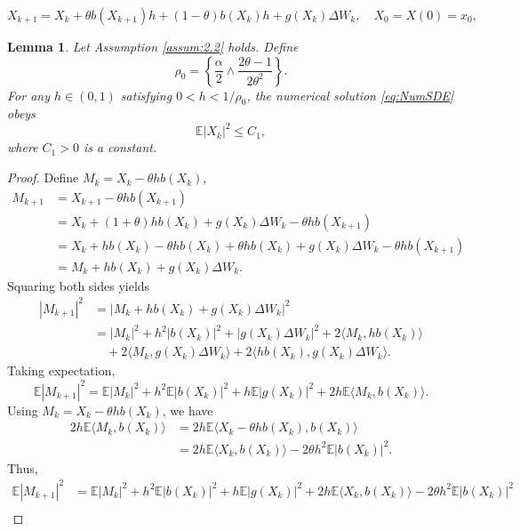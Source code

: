 \documentclass[10pt,a4paper]{amsart}
\newtheorem{lemma}{Lemma}
\begin{document}
\begin{equation}\label{eq:NumSDE}
X_{k+1}=X_k+\theta b(X_{k+1})h+(1-\theta)b(X_k)h+g(X_k)\Delta W_k, \quad X_0=X(0)=x_0,
\end{equation}

\begin{lemma}\label{lem:3.1}
Let Assumption \ref{assum:2.2} holds. Define 
\[
\rho_0 = \left\{ \dfrac{\alpha}{2}\wedge \dfrac{2\theta - 1}{2\theta^2} \right\}.
\]
For any $h\in(0,1)$ satisfying $0 < h < 1/\rho_0$, the numerical solution \eqref{eq:NumSDE} obeys
\[
\mathbb{E}|X_k|^2 \le C_1,
\]
where $C_1 > 0$ is a constant.
\end{lemma}

\begin{proof}
Define $ M_k = X_k - \theta h b(X_k) $,  
\[
\begin{aligned}
	M_{k+1} &= X_{k+1} - \theta h b(X_{k+1}) \\
	&= X_k + (1+\theta)h b(X_k) + g(X_k)\Delta W_k - \theta h b(X_{k+1}) \\
	&= X_k + h b(X_k) - \theta h b(X_k) + \theta h b(X_k) + g(X_k)\Delta W_k - \theta h b(X_{k+1}) \\
	&= M_k + h b(X_k) + g(X_k)\Delta W_k.
\end{aligned}
\]  
Squaring both sides yields  
\[
\begin{aligned}
	|M_{k+1}|^2 &= |M_k + h b(X_k) + g(X_k)\Delta W_k|^2 \\
	&= |M_k|^2 + h^2 |b(X_k)|^2 + |g(X_k)\Delta W_k|^2 + 2\langle M_k, h b(X_k) \rangle \\ &\quad + 2\langle M_k, g(X_k)\Delta W_k \rangle + 2\langle h b(X_k), g(X_k)\Delta W_k \rangle.
\end{aligned}
\]  
Taking expectation,  
\[
\mathbb{E}|M_{k+1}|^2 = \mathbb{E}|M_k|^2 + h^2 \mathbb{E}|b(X_k)|^2 + h \mathbb{E}|g(X_k)|^2 + 2h \mathbb{E}\langle M_k, b(X_k) \rangle.
\]  
Using $ M_k = X_k - \theta h b(X_k) $, we have  
\[
\begin{aligned}
	2h \mathbb{E}\langle M_k, b(X_k) \rangle &= 2h \mathbb{E}\langle X_k - \theta h b(X_k), b(X_k) \rangle \\
	&= 2h \mathbb{E}\langle X_k, b(X_k) \rangle - 2\theta h^2 \mathbb{E}|b(X_k)|^2.
\end{aligned}
\]  
Thus,  
\[
\begin{aligned}
	\mathbb{E}|M_{k+1}|^2 &= \mathbb{E}|M_k|^2 + h^2 \mathbb{E}|b(X_k)|^2 + h \mathbb{E}|g(X_k)|^2 + 2h \mathbb{E}\langle X_k, b(X_k) \rangle - 2\theta h^2 \mathbb{E}|b(X_k)|^2 \\

\end{aligned}\]
\end{proof}
\end{document}
